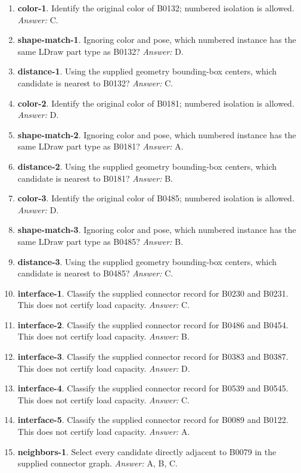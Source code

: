 \begin{enumerate}
\item \textbf{color-1}. Identify the original color of B0132; numbered isolation is allowed. \textit{Answer:} C.
\item \textbf{shape-match-1}. Ignoring color and pose, which numbered instance has the same LDraw part type as B0132? \textit{Answer:} D.
\item \textbf{distance-1}. Using the supplied geometry bounding-box centers, which candidate is nearest to B0132? \textit{Answer:} C.
\item \textbf{color-2}. Identify the original color of B0181; numbered isolation is allowed. \textit{Answer:} D.
\item \textbf{shape-match-2}. Ignoring color and pose, which numbered instance has the same LDraw part type as B0181? \textit{Answer:} A.
\item \textbf{distance-2}. Using the supplied geometry bounding-box centers, which candidate is nearest to B0181? \textit{Answer:} B.
\item \textbf{color-3}. Identify the original color of B0485; numbered isolation is allowed. \textit{Answer:} D.
\item \textbf{shape-match-3}. Ignoring color and pose, which numbered instance has the same LDraw part type as B0485? \textit{Answer:} B.
\item \textbf{distance-3}. Using the supplied geometry bounding-box centers, which candidate is nearest to B0485? \textit{Answer:} C.
\item \textbf{interface-1}. Classify the supplied connector record for B0230 and B0231. This does not certify load capacity. \textit{Answer:} C.
\item \textbf{interface-2}. Classify the supplied connector record for B0486 and B0454. This does not certify load capacity. \textit{Answer:} B.
\item \textbf{interface-3}. Classify the supplied connector record for B0383 and B0387. This does not certify load capacity. \textit{Answer:} D.
\item \textbf{interface-4}. Classify the supplied connector record for B0539 and B0545. This does not certify load capacity. \textit{Answer:} C.
\item \textbf{interface-5}. Classify the supplied connector record for B0089 and B0122. This does not certify load capacity. \textit{Answer:} A.
\item \textbf{neighbors-1}. Select every candidate directly adjacent to B0079 in the supplied connector graph. \textit{Answer:} A, B, C.

\end{enumerate}
